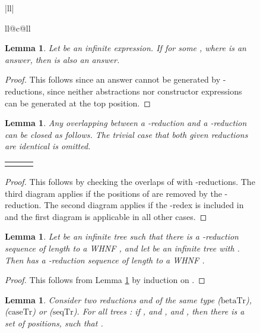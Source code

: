 \documentclass{LMCS}
\theoremstyle{plain}
\newtheorem{lemma}[thm]{Lemma}
\theoremstyle{definition}
\newcommand{\redrule}[1]{{\ensuremath{\mathrm{{#1}}}}}
\newcommand{\rbetaTr}{\redrule{betaTr}}
\newcommand{\rseqTr}{\redrule{seqTr}}
\newcommand{\rcaseTr}{\redrule{caseTr}}
\begin{document}
\begin{figure}[htpb]
\begin{tabular}{|ll|}
\begin{array}{ll@{\quad}c@{\quad}ll}
\begin{lemma}\label{lemma:T-successful-nsr-base-case} Let  be an infinite expression.
 If   for some , where  is an answer, then  is also an answer.
 \end{lemma}
\begin{proof}
This follows since an answer cannot be generated by -reductions, since neither abstractions
nor constructor expressions can be generated at the  top  position.
\end{proof}


\begin{lemma}\label{lemma-R-forking} 
Any overlapping between a -reduction and a -reduction 
 can be closed as follows. The trivial case that both given reductions
are identical is omitted.  

\begin{tabular}{@{}lll@{}}
  \begin{minipage}{0.3\textwidth}
  
  \end{minipage}
&
  \begin{minipage}{0.3\textwidth}
  
  \end{minipage}
&
  \begin{minipage}{0.3\textwidth}
  
  \end{minipage}
 \end{tabular}

 \end{lemma}
 \begin{proof}
 This follows by checking the  overlaps of  with -reductions.   
The third diagram applies if the positions of  are removed by the -reduction.
The second diagram applies if the -redex is included in  and the first diagram is applicable
in all other cases.
 \end{proof}


 
 \begin{lemma}\label{lemma-R-star-forking}
Let  be an infinite  tree such that there is
a -reduction sequence of length  to a WHNF , and let  be an infinite tree with 
.
Then   has a -reduction sequence  of length  to a WHNF .  
 \end{lemma}
 \begin{proof}
This follows from Lemma \ref{lemma-R-forking} by induction on .
 \end{proof}

\begin{lemma}\label{lemma-red-triangle} 
Consider two  reductions   and   of the same type   (\rbetaTr), (\rcaseTr) or (\rseqTr). 
For all trees : if , 
and , and , then there is a set  of positions, such that  . 


\end{lemma}
\end{array}
\end{tabular}
\end{figure}
\end{document}
